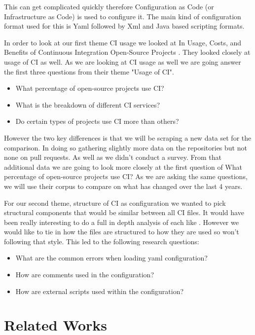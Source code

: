 \documentclass[twoside,12pt,titlepage,a4paper]{article}
\begin{document}
This can get complicated quickly therefore Configuration as Code (or Infrastructure as Code) is used to configure it. The main kind of configuration format used for this is Yaml followed by Xml and Java based scripting formats.


In order to look at our first theme CI usage we looked at In Usage, Costs, and Benefits of Continuous Integration Open-Source Projects \cite{Hilton2016}. They looked closely at usage of CI as well. As we are looking at CI usage as well we are going answer the first three questions from their theme "Usage of CI". 
\begin{itemize}
  \item What percentage of open-source projects use CI?
  \item What is the breakdown of different CI services?
  \item Do certain types of projects use CI more than others?
\end{itemize}

However the two key differences is that we will be scraping a new data set for the comparison. In doing so gathering slightly more data on the repositories but not none on pull requests. As well as we didn't conduct a survey. From that additional data we are going to look more closely at the first question of What percentage of open-source projects use CI?
As we are asking the same questions, we will use their corpus to compare on what has changed over the last 4 years. 

For our second theme, structure of CI as configuration we wanted to pick structural components that would be similar between all CI files. It would have been really interesting to do a full in depth analysis of each like \citet{Gallaba2018}. However we would like to tie in how the files are structured to how they are used so won't following that style. This led to the following research questions:
\begin{itemize}
  \item What are the common errors when loading yaml configuration?
  \item How are comments used in the configuration?
  \item How are external scripts used within the configuration?
\end{itemize}

\section{Related Works}
\vspace*{-0.05in}
\end{document}
